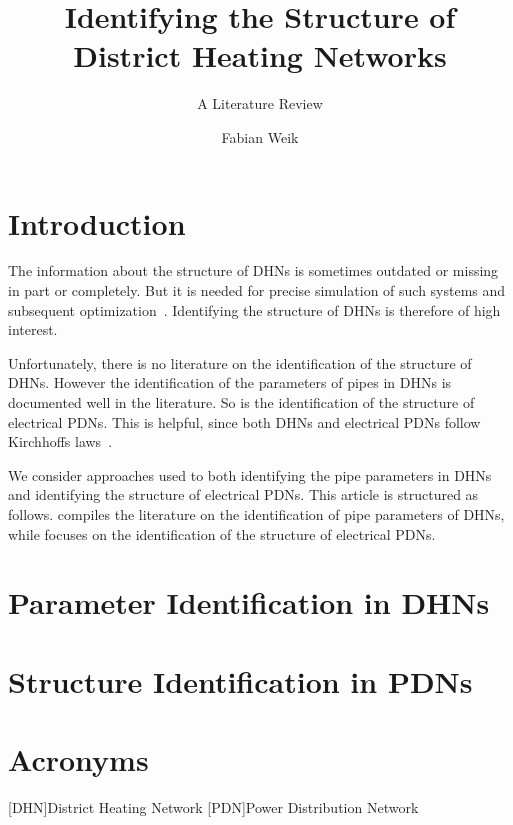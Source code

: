 \documentclass{scrartcl}
\title{Identifying the Structure of \\ District Heating Networks}
\subtitle{A Literature Review}
\author{Fabian Weik}
\begin{document}
    \maketitle

    \section{Introduction}

    The information about the structure of \acp{DHN} is sometimes outdated or missing in part or completely.
    But it is needed for precise simulation of such systems and subsequent optimization~\cite{adnetheat}.
    Identifying the structure of \acp{DHN} is therefore of high interest.

    Unfortunately, there is no literature on the identification of the structure of \acp{DHN}.
    However the identification of the parameters of pipes in \acp{DHN} is documented well in the literature.
    So is the identification of the structure of electrical \acp{PDN}.
    This is helpful, since both \acp{DHN} and electrical \acp{PDN} follow Kirchhoffs laws~\cite{Moser2016waterelectricitysimilarity}.

    We consider approaches used to both identifying the pipe parameters in \acp{DHN} and identifying the structure of electrical \acp{PDN}.
    This article is structured as follows.
     compiles the literature on the identification of pipe parameters of \acp{DHN}, while  focuses on the identification of the structure of electrical \acp{PDN}.

    \section{Parameter Identification in \acp{DHN}}
    \label{sec:parameter-identification}

    \section{Structure Identification in \acp{PDN}}
    \label{sec:structure-identification}

    \printbibliography

    \section{Acronyms}

    \begin{acronym}
        [DHN]{District Heating Network}
        [PDN]{Power Distribution Network}
    \end{acronym}
\end{document}
